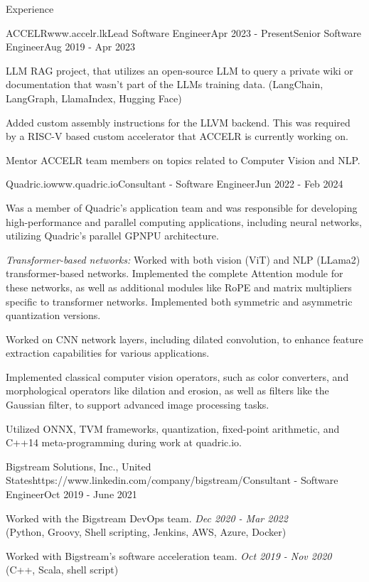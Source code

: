 \documentclass[
	11pt, %
]{./assets/resume} %
\begin{document}
\begin{rSection}{Experience}
    \begin{rSubsectionM}{ACCELR}{www.accelr.lk}{Lead Software Engineer}{Apr 2023 - Present}{Senior Software Engineer}{Aug 2019 - Apr 2023}{}{}
        \item LLM RAG project, that utilizes an open-source LLM to query a private wiki or documentation that wasn't part of the LLMs training data. (LangChain, LangGraph, LlamaIndex, Hugging Face)
        \item Added custom assembly instructions for the LLVM backend. This was required by a RISC-V based custom accelerator that ACCELR is currently working on.
        \item Mentor ACCELR team members on topics related to Computer Vision and NLP.
	\end{rSubsectionM}

    \begin{rSubsectionX}{Quadric.io}{www.quadric.io}{Consultant - Software Engineer}{Jun 2022 - Feb 2024}
        \item Was a member of Quadric's application team and was responsible for developing high-performance and parallel computing applications, including neural networks, utilizing Quadric's parallel GPNPU architecture.
        \item \textit{Transformer-based networks:} Worked with both vision (ViT) and NLP (LLama2) transformer-based networks. Implemented the complete Attention module for these networks, as well as additional modules like RoPE and matrix multipliers specific to transformer networks. Implemented both symmetric and asymmetric quantization versions.
        \item Worked on CNN network layers, including dilated convolution, to enhance feature extraction capabilities for various applications.
        \item Implemented classical computer vision operators, such as color converters, and morphological operators like dilation and erosion, as well as filters like the Gaussian filter, to support advanced image processing tasks.
        \item Utilized ONNX, TVM frameworks, quantization, fixed-point arithmetic, and C++14 meta-programming during work at quadric.io.
    \end{rSubsectionX}

    \begin{rSubsectionX}{Bigstream Solutions, Inc., United States}{https://www.linkedin.com/company/bigstream/}{Consultant - Software Engineer}{Oct 2019 - June 2021}
        \item Worked with the Bigstream DevOps team. \hfill {\textit{Dec 2020 - Mar 2022}} \\(Python, Groovy, Shell scripting, Jenkins, AWS, Azure, Docker)
        \item Worked with Bigstream's software acceleration team. \hfill {\textit{Oct 2019 - Nov 2020}} \\(C++, Scala, shell script)
    \end{rSubsectionX}


\end{rSection}
\end{document}
